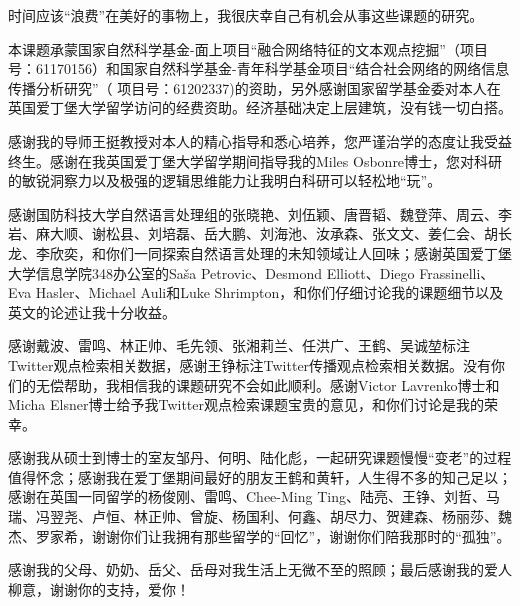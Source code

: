 

\begin{ack}
  时间应该“浪费”在美好的事物上，我很庆幸自己有机会从事这些课题的研究。
  
本课题承蒙国家自然科学基金-面上项目“融合网络特征的文本观点挖掘”（项目号：61170156）和国家自然科学基金-青年科学基金项目“结合社会网络的网络信息传播分析研究”（ 项目号：61202337)的资助，另外感谢国家留学基金委对本人在英国爱丁堡大学留学访问的经费资助。经济基础决定上层建筑，没有钱一切白搭。

感谢我的导师王挺教授对本人的精心指导和悉心培养，您严谨治学的态度让我受益终生。感谢在我英国爱丁堡大学留学期间指导我的Miles Osbonre博士，您对科研的敏锐洞察力以及极强的逻辑思维能力让我明白科研可以轻松地“玩”。

感谢国防科技大学自然语言处理组的张晓艳、刘伍颖、唐晋韬、魏登萍、周云、李岩、麻大顺、谢松县、刘培磊、岳大鹏、刘海池、汝承森、张文文、姜仁会、胡长龙、李欣奕，和你们一同探索自然语言处理的未知领域让人回味；感谢英国爱丁堡大学信息学院348办公室的Saša Petrovic、Desmond Elliott、Diego Frassinelli、Eva Hasler、Michael Auli和Luke Shrimpton，和你们仔细讨论我的课题细节以及英文的论述让我十分收益。

感谢戴波、雷鸣、林正帅、毛先领、张湘莉兰、任洪广、王鹤、吴诚堃标注Twitter观点检索相关数据，感谢王铮标注Twitter传播观点检索相关数据。没有你们的无偿帮助，我相信我的课题研究不会如此顺利。感谢Victor Lavrenko博士和Micha Elsner博士给予我Twitter观点检索课题宝贵的意见，和你们讨论是我的荣幸。

感谢我从硕士到博士的室友邹丹、何明、陆化彪，一起研究课题慢慢“变老”的过程值得怀念；感谢我在爱丁堡期间最好的朋友王鹤和黄轩，人生得不多的知己足以；感谢在英国一同留学的杨俊刚、雷鸣、Chee-Ming Ting、陆亮、王铮、刘哲、马瑞、冯翌尧、卢恒、林正帅、曾旋、杨国利、何鑫、胡尽力、贺建森、杨丽莎、魏杰、罗家希，谢谢你们让我拥有那些留学的“回忆”，谢谢你们陪我那时的“孤独”。

感谢我的父母、奶奶、岳父、岳母对我生活上无微不至的照顾；最后感谢我的爱人柳意，谢谢你的支持，爱你！
\end{ack}
